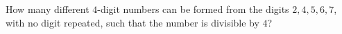 How many different $4$-digit numbers can be formed from the digits $2,4,5,6,7$, with no digit repeated, such that the number is divisible by $4$?

